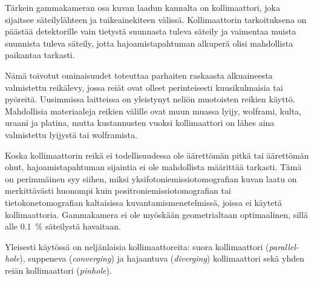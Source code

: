 Tärkein gammakameran osa kuvan laadun kannalta on kollimaattori, joka sijaitsee säteilylähteen ja tuikeainekiteen välissä. Kollimaattorin tarkoituksena on päästää detektorille vain tietystä suunnasta tuleva säteily ja vaimentaa muista suunnista tuleva säteily, jotta hajoamistapahtuman alkuperä olisi mahdollista paikantaa tarkasti.\cite{cherry_gamma_2012, slomka_novel_2022}

Nämä toivotut ominaisuudet toteuttaa parhaiten raskaasta alkuaineesta valmistettu reikälevy, jossa reiät ovat olleet perinteisesti kuusikulmaisia tai pyöreitä.\cite{van_audenhaege_review_2015, cherry_gamma_2012} Uusimmissa laitteissa on yleistynyt neliön muotoisten reikien käyttö\cite{ljungberg_spectct_2018, slomka_novel_2022}. Mahdollisia materiaaleja reikien välille ovat muun muassa lyijy, wolframi, kulta, uraani ja platina\cite{van_audenhaege_review_2015}, mutta kustannusten vuoksi\cite{van_audenhaege_review_2015} kollimaattori on lähes aina valmistettu lyijystä tai wolframista.\cite{cherry_gamma_2012}

Koska kollimaattorin reikä ei todellisuudessa ole äärettömän pitkä tai äärettömän ohut, hajoamistapahtuman sijaintia ei ole mahdollista määrittää tarkasti. Tämä on perimmäinen syy siihen, miksi yksifotoniemissiotomografian kuvan laatu on merkittävästi huonompi kuin positroniemissiotomografian tai tietokonetomografian kaltaisissa kuvantamismenetelmissä, joissa ei käytetä kollimaattoria.\cite{cherry_gamma_2012} Gammakamera ei ole myöskään geometrialtaan optimaalinen, sillä alle \qty{0,1}{\percent} säteilystä havaitaan\cite{slomka_novel_2022}.
 
Yleisesti käytössä on neljänlaisia kollimaattoreita: suora kollimaattori (\textit{parallel-hole}), suppeneva (\textit{converging}) ja hajaantuva (\textit{diverging}) kollimaattori sekä yhden reiän kollimaattori (\textit{pinhole})\cite{cherry_gamma_2012, van_audenhaege_review_2015}.

